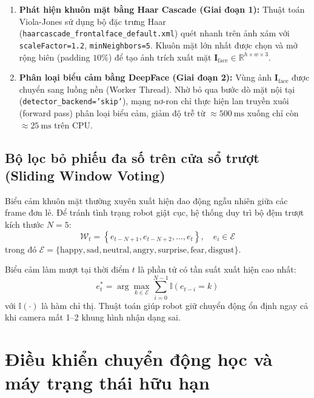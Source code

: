 \begin{enumerate}
    \item \textbf{Phát hiện khuôn mặt bằng Haar Cascade (Giai đoạn 1):}
    Thuật toán Viola-Jones sử dụng bộ đặc trưng Haar (\texttt{haarcascade\_frontalface\_default.xml}) quét nhanh trên ảnh xám với \texttt{scaleFactor=1.2}, \texttt{minNeighbors=5}. Khuôn mặt lớn nhất được chọn và mở rộng biên (padding $10\%$) để tạo ảnh trích xuất mặt $\mathbf{I}_{\text{face}} \in \mathbb{R}^{h \times w \times 3}$.
    \item \textbf{Phân loại biểu cảm bằng DeepFace (Giai đoạn 2):}
    Vùng ảnh $\mathbf{I}_{\text{face}}$ được chuyển sang luồng nền (Worker Thread). Nhờ bỏ qua bước dò mặt nội tại (\texttt{detector\_backend='skip'}), mạng nơ-ron chỉ thực hiện lan truyền xuôi (forward pass) phân loại biểu cảm, giảm độ trễ từ $\approx \SI{500}{\milli\second}$ xuống chỉ còn $\approx \SI{25}{\milli\second}$ trên CPU.
\end{enumerate}

\subsection{Bộ lọc bỏ phiếu đa số trên cửa sổ trượt (Sliding Window Voting)}
Biểu cảm khuôn mặt thường xuyên xuất hiện dao động ngẫu nhiên giữa các frame đơn lẻ. Để tránh tình trạng robot giật cục, hệ thống duy trì bộ đệm trượt kích thước $N = 5$:
\begin{equation}
    \mathcal{W}_t = \left\{ e_{t-N+1}, e_{t-N+2}, \dots, e_t \right\}, \quad e_i \in \mathcal{E}
\end{equation}
trong đó $\mathcal{E} = \{\text{happy}, \text{sad}, \text{neutral}, \text{angry}, \text{surprise}, \text{fear}, \text{disgust}\}$.

Biểu cảm làm mượt tại thời điểm $t$ là phần tử có tần suất xuất hiện cao nhất:
\begin{equation}
    e^*_t = \arg\max_{k \in \mathcal{E}} \sum_{i=0}^{N-1} \mathbb{I}\left( e_{t-i} = k \right)
\end{equation}
với $\mathbb{I}(\cdot)$ là hàm chỉ thị. Thuật toán giúp robot giữ chuyển động ổn định ngay cả khi camera mất 1--2 khung hình nhận dạng sai.

\section{Điều khiển chuyển động học và máy trạng thái hữu hạn}

